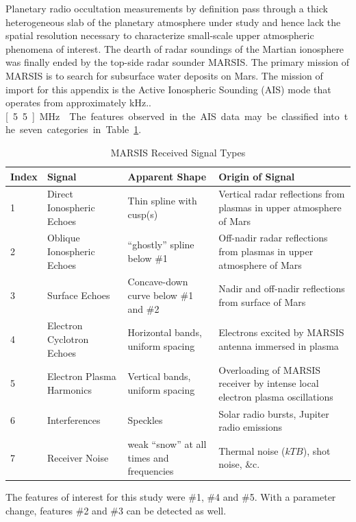 Planetary radio occultation measurements by definition pass through a thick heterogeneous slab of the planetary atmosphere under study and hence lack the spatial resolution necessary to characterize small-scale upper atmospheric phenomena of interest. 
The dearth of radar soundings of the Martian ionosphere was finally ended by the top-side radar sounder MARSIS. 
The primary mission of MARSIS is to search for subsurface water deposits on Mars.
The mission of import for this appendix is the Active Ionospheric Sounding (AIS) mode that operates from approximately \unit[100]{kHz}..\unit[5.5]{MHz} \citep{gurnett2005}. 
The features observed in the AIS data may be classified into the seven categories in Table~\ref{tab:sigCat}.
\begin{table}\footnotesize    \centering
    \caption{MARSIS Received Signal Types}\label{tab:sigCat}
    \begin{tabular*}{1\textwidth}{p{0.85cm}p{2.89cm}p{4.5cm}p{5.5cm}}
       \toprule
        Index & Signal & Apparent Shape & Origin of Signal\\
        \midrule
        1 & Direct Ionospheric Echoes & Thin spline with cusp(s) & Vertical radar reflections from plasmas in upper atmosphere of Mars\\ 
        2 & Oblique Ionospheric Echoes	& ``ghostly'' spline below \#1 & Off-nadir radar reflections from plasmas in upper atmosphere of Mars\\ 
        3 & Surface Echoes & Concave-down curve below \#1 and \#2 & Nadir and off-nadir reflections from surface of Mars\\ 
        4 & Electron Cyclotron Echoes & Horizontal bands, uniform spacing & Electrons excited by MARSIS antenna immersed in plasma\\ 
        5 & Electron Plasma Harmonics & Vertical bands, uniform spacing & Overloading of MARSIS receiver by intense local electron plasma oscillations \\ 
        6 & Interferences & Speckles & Solar radio bursts, Jupiter radio emissions \citep{gurnett2010} \\ 
        7 & Receiver Noise & weak ``snow'' at all times and frequencies  & Thermal noise ($kTB$), shot noise, \&c.\\
        \bottomrule
    \end{tabular*} 
    

\end{table}
The features of interest for this study were \#1, \#4 and \#5. 
With a parameter change, features \#2 and \#3 can be detected as well.

